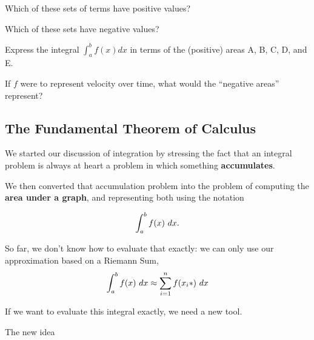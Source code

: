 \problem 
Which of these sets of terms have positive values?

\vfill

Which of these sets have negative values?
\vfill

\newpage

\begin{center}
\end{center}
\problem 
{Express the integral $\displaystyle \int_a^b f(x) dx$ in
  terms of the (positive) areas A, B, C, D, and E.  }

\vfill
\vfill

{If $f$ were to represent velocity over time, what would the ``negative
  areas'' represent?}

\vfill
\newpage


% 


\subsection*{The Fundamental Theorem of Calculus}
We started our discussion of integration by stressing
the fact that an integral problem is always at heart a problem in
which something {\bf accumulates}. 

We then converted that accumulation problem into the problem of
computing the {\bf area under a graph}, and representing 
both using the notation

$$\displaystyle \int_a^b f(x)~dx.$$

So far, we don't know how to evaluate that exactly: we can only use our approximation
based on a Riemann Sum,
$$\displaystyle \int_a^b f(x)~dx \approx \sum_{i=1}^n f(x_i*) ~dx$$

If we want to evaluate this integral exactly, we need a new tool.

\newpage

The new idea 

